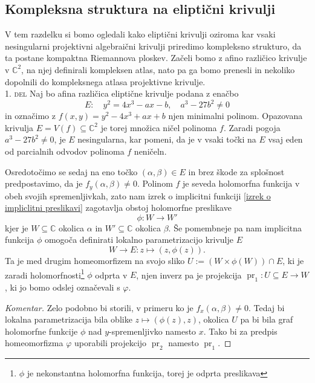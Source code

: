 \documentclass[mat1]{fmfdelo}
\newcommand{\C}{\mathbb C}
\DeclareMathOperator{\pr}{pr}
\theoremstyle{definition}
\newenvironment{komentar}[1][Komentar]{\begin{proof}[#1]\let\qed\relax}{\end{proof}}
\begin{document}

\subsection{Kompleksna struktura na eliptični krivulji}

V tem razdelku si bomo ogledali kako eliptični krivulji oziroma kar vsaki nesingularni projektivni algebraični krivulji priredimo kompleksno strukturo, da ta postane kompaktna Riemannova ploskev. Začeli bomo z afino različico krivulje v $\C^2$, na njej definirali kompleksen atlas, nato pa ga bomo prenesli in nekoliko dopolnili do kompleksnega atlasa projektivne krivulje. 
\\

\textsc{1. del} Naj bo afina različica eliptične krivulje podana z enačbo
\[
    E: \quad y^2 = 4x^3 - ax - b, \quad a^3 - 27b^2 \neq 0
\]
in označimo z $f(x,y) = y^2 - 4x^3 + ax + b$ njen minimalni polinom. Opazovana krivulja $E = V(f) \subseteq \C^2$ je torej množica ničel polinoma $f$. Zaradi pogoja $a^3 - 27b^2 \neq 0$, je $E$ nesingularna, kar pomeni, da je v vsaki točki na $E$ vsaj eden od parcialnih odvodov polinoma $f$ neničeln. 

Osredotočimo se sedaj na eno točko $(\alpha, \beta) \in E$ in brez škode za splošnost predpostavimo, da je $f_y(\alpha, \beta) \neq 0$. Polinom $f$ je seveda holomorfna funkcija v obeh svojih spremenljivkah, zato nam izrek o implicitni funkciji \ref{izrek o impliclitni preslikavi} zagotavlja obstoj holomorfne preslikave 
\[
    \phi : W \to W'  
\]
kjer je $W \subseteq \C$ okolica $\alpha$ in $W' \subseteq \C$ okolica $\beta$. Še pomembneje pa nam implicitna funkcija $\phi$ omogoča definirati lokalno parametrizacijo krivulje $E$
\[
    W \to E : z \mapsto (z, \phi(z)).
\] 
Ta je med drugim homeomorfizem na svojo sliko $U := (W \times \phi(W)) \cap E$, ki je zaradi holomorfnosti\footnote{$\phi$ je nekonstantna holomorfna funkcija, torej je odprta preslikava} $\phi$ odprta v $E$, njen inverz pa je projekcija $\pr_1 : U \subseteq E \to W$, ki jo bomo odslej označevali s $\varphi$. 



\begin{komentar}
    Zelo podobno bi storili, v primeru ko je $f_x(\alpha, \beta) \neq 0$. Tedaj bi lokalna parametrizacija bila oblike $z \mapsto (\phi(z), z)$, okolica $U$ pa bi bila graf holomorfne funkcije $\phi$ nad $y$-spremenljivko namesto $x$. Tako bi za predpis homeomorfizma $\varphi$ uporabili projekcijo $\pr_2$ namesto $\pr_1$.
\end{komentar}
\end{document}
